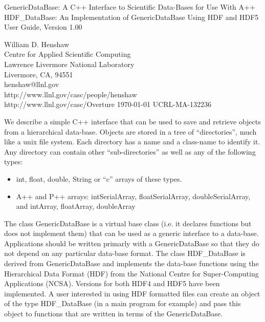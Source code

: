 \documentclass{article}
\begin{document}
\vspace{5\baselineskip}
\begin{flushleft}
{\Large
GenericDataBase: A C++ Interface to Scientific Data-Bases for Use With A++\\
\vspace{ .25\baselineskip}
HDF\_DataBase: An Implementation of GenericDataBase Using HDF and HDF5 \\
\vspace{ .5\baselineskip}
User Guide, Version 1.00 \\
}

\vspace{2\baselineskip}
William D. Henshaw                   \\
Centre for Applied Scientific Computing \\
Lawrence Livermore National Laboratory    \\
Livermore, CA, 94551   \\
henshaw@llnl.gov \\
http://www.llnl.gov/casc/people/henshaw \\
http://www.llnl.gov/casc/Overture
\vspace{2\baselineskip}
\today
\vspace{\baselineskip}
UCRL-MA-132236

\vspace{4\baselineskip}

We describe a simple C++ interface that can be used to save and retrieve objects
from a hierarchical data-base. Objects are stored in a tree of ``directories'',
much like a unix file system.
Each directory has a name and a class-name to identify it. Any directory can
contain other ``sub-directories'' as well as any of the following types:
\begin{itemize}
  \item int, float, double, String or ``c'' arrays of these types.
  \item A++ and P++ arrays: intSerialArray, floatSerialArray, doubleSerialArray, and
   intArray, floatArray, doubleArray
\end{itemize}
The class {\ff GenericDataBase} is a virtual base class (i.e. it declares functions
but does not implement them) that can be used as a generic interface to a data-base.
Applications should be written primarly with a {\ff GenericDataBase} so that they
do not depend on any particular data-base format.
The class {\ff HDF\_DataBase} is derived from {\ff GenericDataBase} and implements
the data-base functions using the Hierarchical Data Format (HDF) from the National Centre
for Super-Computing Applications (NCSA). Versions for both HDF4 and HDF5 have been implemented.
A user interested in using HDF formatted files
can create an object of the type {\ff HDF\_DataBase} (in a main program for example) and pass
this object to functions that are written in terms of the {\ff GenericDataBase}.

\end{flushleft}
\end{document}
